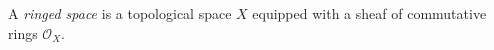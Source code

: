 
A \emph{ringed space} is a topological space $X$ equipped with a sheaf of commutative rings $\mathcal O_X$.
